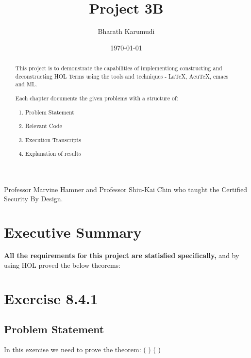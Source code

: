 \documentclass{report}
\title{Project 3B}
\author{Bharath Karumudi}
\date{\today}
\begin{document}
 \lstset{language=ML}
 \maketitle{}

 \begin{abstract}
   This project is to demonstrate the capabilities of implementiong
   constructing and deconstructing HOL Terms using the tools and
   techniques - \LaTeX{}, AcuTeX, emacs and ML. 

   Each chapter documents the given problems with a structure of:
   \begin{enumerate}
   \item Problem Statement
   \item Relevant Code
   \item Execution Transcripts
   \item Explanation of results
   \end{enumerate}

 \end{abstract}


 \begin{acknowledgments}
  Professor Marvine Hamner and Professor Shiu-Kai Chin who taught the
  Certified Security By Design.
 \end{acknowledgments}

 \tableofcontents{}

 \chapter{Executive Summary}
 \label{cha:executive-summary}

\textbf{All the requirements for this project are statisfied specifically,}
 and by using HOL proved the below theorems:
\begin{quote}
\HOLprojectThreebTheorems
\end{quote}



 \chapter{Exercise 8.4.1}
 \label{cha:exercise-8.4.1}
  
 \section{Problem Statement}
 \label{sec:problem-statement-1}

In this exercise we need to prove the theorem:
\HOLTokenTurnstile{}  \HOLSymConst{\HOLTokenImp{}} ( \HOLSymConst{\HOLTokenImp{}} ) \HOLSymConst{\HOLTokenImp{}} ( \HOLSymConst{\HOLTokenImp{}} ) \HOLSymConst{\HOLTokenImp{}} 
\end{document}
